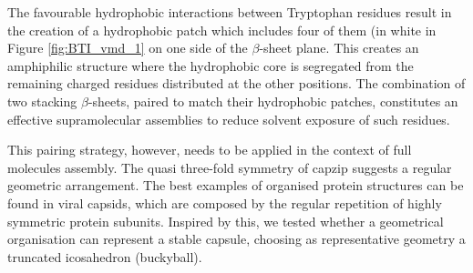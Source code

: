 
The favourable hydrophobic interactions between Tryptophan residues result in the creation of a hydrophobic patch which includes four of them (in white in Figure \ref{fig:BTI_vmd_1} on one side of the $\beta$-sheet plane.
%
This creates an amphiphilic structure where the hydrophobic core is segregated from the remaining charged residues distributed at the other positions.
%
The combination of two stacking $\beta$-sheets, paired to match their hydrophobic patches, constitutes an effective supramolecular assemblies to reduce solvent exposure of such residues.

This pairing strategy, however, needs to be applied in the context of full molecules assembly.
%
The quasi three-fold symmetry of capzip suggests a regular geometric arrangement.
%
The best examples of organised protein structures can be found in viral capsids, which are composed by the regular repetition of highly symmetric protein subunits.
%
Inspired by this, we tested whether a geometrical organisation can represent a stable capsule, choosing as representative geometry a truncated icosahedron (buckyball).

